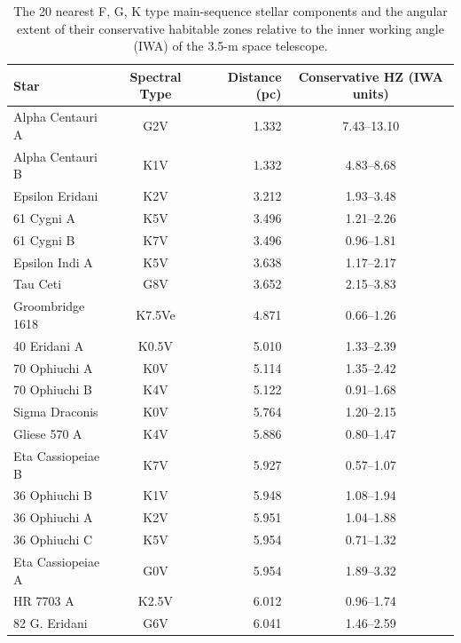\begin{table}[htbp]
\centering
\caption{The 20 nearest F, G, K type main-sequence stellar 
components and the angular extent of their conservative habitable 
zones relative to the inner working angle (IWA) of the 3.5-m 
space telescope.}
\label{tab:fgk20}
\small
\begin{tabular}{l c r c}
\toprule
Star & Spectral Type & Distance (pc) &
Conservative HZ (IWA units) \\
\midrule
Alpha Centauri A    & G2V    & 1.332 & 7.43--13.10 \\
Alpha Centauri B    & K1V    & 1.332 & 4.83--8.68 \\
Epsilon Eridani     & K2V    & 3.212 & 1.93--3.48 \\
61 Cygni A          & K5V    & 3.496 & 1.21--2.26 \\
61 Cygni B          & K7V    & 3.496 & 0.96--1.81 \\
Epsilon Indi A      & K5V    & 3.638 & 1.17--2.17 \\
Tau Ceti            & G8V    & 3.652 & 2.15--3.83 \\
Groombridge 1618    & K7.5Ve & 4.871 & 0.66--1.26 \\
40 Eridani A        & K0.5V  & 5.010 & 1.33--2.39 \\
70 Ophiuchi A       & K0V    & 5.114 & 1.35--2.42 \\
70 Ophiuchi B       & K4V    & 5.122 & 0.91--1.68 \\
Sigma Draconis      & K0V    & 5.764 & 1.20--2.15 \\
Gliese 570 A        & K4V    & 5.886 & 0.80--1.47 \\
Eta Cassiopeiae B   & K7V    & 5.927 & 0.57--1.07 \\
36 Ophiuchi B       & K1V    & 5.948 & 1.08--1.94 \\
36 Ophiuchi A       & K2V    & 5.951 & 1.04--1.88 \\
36 Ophiuchi C       & K5V    & 5.954 & 0.71--1.32 \\
Eta Cassiopeiae A   & G0V    & 5.954 & 1.89--3.32 \\
HR 7703 A           & K2.5V  & 6.012 & 0.96--1.74 \\
82 G. Eridani       & G6V    & 6.041 & 1.46--2.59 \\
\bottomrule
\end{tabular}


\end{table}
